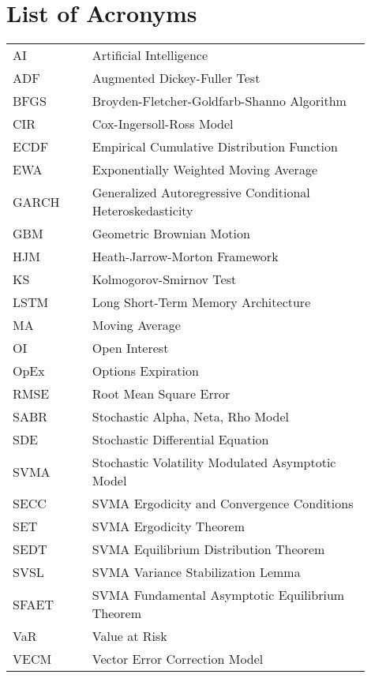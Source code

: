 \documentclass[12pt]{report}
\begin{document}
\chapter*{List of Acronyms}
\begin{tabular}{p{0.2\linewidth}p{0.7\linewidth}}
    AI & Artificial Intelligence \\
    ADF & Augmented Dickey-Fuller Test \\
    BFGS & Broyden-Fletcher-Goldfarb-Shanno Algorithm \\
    CIR & Cox-Ingersoll-Ross Model \\
    ECDF & Empirical Cumulative Distribution Function \\
    EWA & Exponentially Weighted Moving Average \\
    GARCH & Generalized Autoregressive Conditional Heteroskedasticity \\
    GBM & Geometric Brownian Motion \\
    HJM & Heath-Jarrow-Morton Framework \\
    KS & Kolmogorov-Smirnov Test \\
    LSTM & Long Short-Term Memory Architecture \\
    MA & Moving Average \\
    OI & Open Interest \\
    OpEx & Options Expiration \\
    RMSE & Root Mean Square Error \\
    SABR & Stochastic Alpha, Neta, Rho Model \\
    SDE & Stochastic Differential Equation \\
    SVMA & Stochastic Volatility Modulated Asymptotic Model \\
    SECC & SVMA Ergodicity and Convergence Conditions \\
    SET & SVMA Ergodicity Theorem \\
    SEDT & SVMA Equilibrium Distribution Theorem \\
    SVSL & SVMA Variance Stabilization Lemma \\
    SFAET & SVMA Fundamental Asymptotic Equilibrium Theorem \\
    VaR & Value at Risk \\
    VECM & Vector Error Correction Model \\
\end{tabular}
\clearpage
\newpage
\listoftables
\clearpage
\newpage
\listoffigures
\clearpage
\newpage
{}
\setcounter{page}{1}
\end{document}
